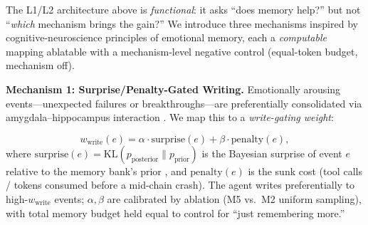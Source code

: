 The L1/L2 architecture above is \emph{functional}: it asks ``does memory help?'' but not ``\emph{which} mechanism brings the gain?'' We introduce three mechanisms inspired by cognitive-neuroscience principles of emotional memory, each a \emph{computable} mapping ablatable with a mechanism-level negative control (equal-token budget, mechanism off).

{\sloppy \textbf{Mechanism 1: Surprise/Penalty-Gated Writing.} Emotionally arousing events---unexpected failures or breakthroughs---are preferentially consolidated via amygdala--hippocampus interaction \cite{mcgaugh2004}. We map this to a \emph{write-gating weight}:\par}
\begin{equation}
\label{eq:write-gate}
w_{\text{write}}(e) = \alpha \cdot \text{surprise}(e) + \beta \cdot \text{penalty}(e),
\end{equation}
where $\text{surprise}(e) = \text{KL}(p_{\text{posterior}} \| p_{\text{prior}})$ is the Bayesian surprise of event $e$ relative to the memory bank's prior \cite{ittibaldi2009}, and $\text{penalty}(e)$ is the sunk cost (tool calls / tokens consumed before a mid-chain crash). The agent writes preferentially to high-$w_{\text{write}}$ events; $\alpha,\beta$ are calibrated by ablation (M5 vs.\ M2 uniform sampling), with total memory budget held equal to control for ``just remembering more.''

